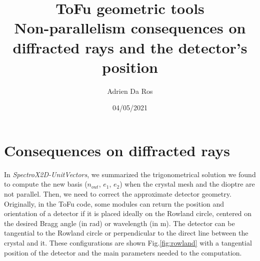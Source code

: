 \documentclass[a4paper,11pt,twoside,openright]{article}
\begin{document}
\title{ToFu geometric tools \\ Non-parallelism consequences on diffracted rays and the detector's position}
\author{Adrien Da Ros}
\date{04/05/2021}
\maketitle

\tableofcontents
\newpage
\section{Consequences on diffracted rays}
In \textit{SpectroX2D-UnitVectors}, we summarized the trigonometrical solution we found to compute the new basis ($n_{out}$, $e_{1}$, $e_{2}$) when the crystal mesh and the dioptre are not parallel. Then, we need to correct the approximate detector geometry. \\
Originally, in the ToFu code, some modules can return the position and orientation of a detector if it is placed ideally on the Rowland circle, centered on the desired Bragg angle (in rad) or wavelength (in m). The detector can be tangential to the Rowland circle or perpendicular to the direct line between the crystal and it. These configurations are shown Fig.\ref{fig:rowland} with a tangential position of the detector and the main parameters needed to the computation.
\end{document}

